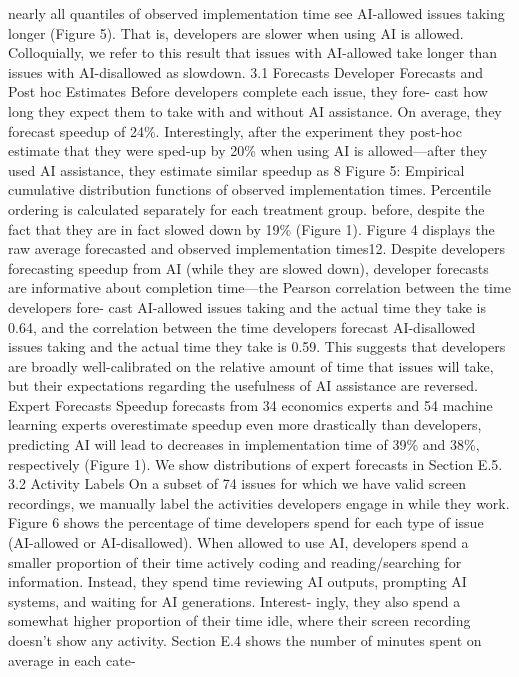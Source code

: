 nearly all quantiles of observed implementation time see AI-allowed issues taking longer (Figure 5).
That is, developers are slower when using AI is allowed. Colloquially, we refer to this result that
issues with AI-allowed take longer than issues with AI-disallowed as slowdown.
3.1
Forecasts
Developer Forecasts and Post hoc Estimates
Before developers complete each issue, they fore-
cast how long they expect them to take with and without AI assistance. On average, they forecast
speedup of 24\%. Interestingly, after the experiment they post-hoc estimate that they were sped-up
by 20\% when using AI is allowed—after they used AI assistance, they estimate similar speedup as
8
Figure 5: Empirical cumulative distribution functions of observed implementation times. Percentile
ordering is calculated separately for each treatment group.
before, despite the fact that they are in fact slowed down by 19\% (Figure 1). Figure 4 displays the
raw average forecasted and observed implementation times12.
Despite developers forecasting speedup from AI (while they are slowed down), developer forecasts
are informative about completion time—the Pearson correlation between the time developers fore-
cast AI-allowed issues taking and the actual time they take is 0.64, and the correlation between the
time developers forecast AI-disallowed issues taking and the actual time they take is 0.59. This
suggests that developers are broadly well-calibrated on the relative amount of time that issues will
take, but their expectations regarding the usefulness of AI assistance are reversed.
Expert Forecasts
Speedup forecasts from 34 economics experts and 54 machine learning experts
overestimate speedup even more drastically than developers, predicting AI will lead to decreases
in implementation time of 39\% and 38\%, respectively (Figure 1). We show distributions of expert
forecasts in Section E.5.
3.2
Activity Labels
On a subset of 74 issues for which we have valid screen recordings, we manually label the activities
developers engage in while they work. Figure 6 shows the percentage of time developers spend
for each type of issue (AI-allowed or AI-disallowed). When allowed to use AI, developers spend a
smaller proportion of their time actively coding and reading/searching for information. Instead, they
spend time reviewing AI outputs, prompting AI systems, and waiting for AI generations. Interest-
ingly, they also spend a somewhat higher proportion of their time idle, where their screen recording
doesn’t show any activity. Section E.4 shows the number of minutes spent on average in each cate-
